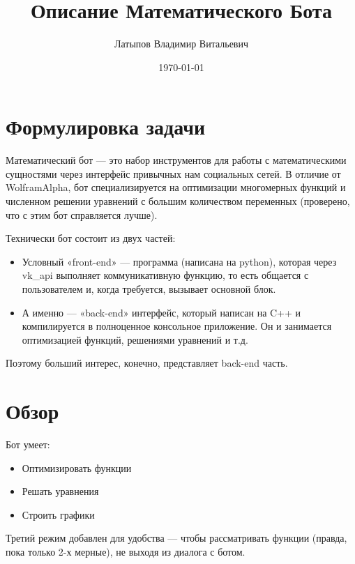 \documentclass[11pt]{article}
\title{Описание Математического Бота}
\author{Латыпов Владимир Витальевич}
\date{\today}
\begin{document}
    \maketitle
    \newpage

    \tableofcontents
    \newpage


    \section{Формулировка задачи}\label{sec:formulating-task}
    Математический бот — это набор инструментов для работы с математическими сущностями через интерфейс привычных нам социальных сетей.
    В отличие от WolframAlpha, бот специализируется на оптимизации многомерных функций и численном решении уравнений с большим количеством переменных
    (проверено, что с этим бот справляется лучше).

    Технически бот состоит из двух частей:
    \begin{itemize}
        \item Условный «front-end» — программа (написана на python), которая через vk\_api выполняет коммуникативную функцию, то есть общается с пользователем и,
        когда требуется, вызывает основной блок.
        \item А именно — «back-end» интерфейс, который написан на C++ и компилируется в полноценное консольное приложение.
        Он и занимается оптимизацией функций, решениями уравнений и т.д.
    \end{itemize}

    Поэтому больший интерес, конечно, представляет back-end часть.

    \section{Обзор}\label{sec:overview}

    Бот умеет:
    \begin{itemize}
        \item Оптимизировать функции
        \item Решать уравнения
        \item Строить графики
    \end{itemize}

    Третий режим добавлен для удобства — чтобы рассматривать функции (правда, пока только 2-х мерные),
    не выходя из диалога с ботом.
\end{document}
